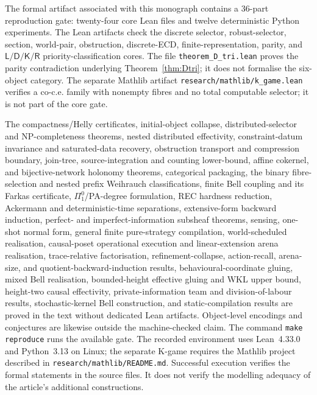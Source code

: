 \documentclass[11pt]{article}
\theoremstyle{plain}
\theoremstyle{definition}
\theoremstyle{remark}
\begin{document}
The formal artifact associated with this monograph contains a 36-part reproduction
gate: twenty-four core Lean files and twelve deterministic Python experiments.
The Lean artifacts check the discrete selector, robust-selector, section,
world-pair, obstruction, discrete-ECD, finite-representation, parity, and
$\mathsf L/\mathsf D/\mathsf K/\mathsf R$ priority-classification cores.
The file \texttt{theorem\_D\_tri.lean} proves the parity contradiction underlying
Theorem~\ref{thm:Dtri}; it does not formalise the six-object category. The
separate Mathlib artifact \texttt{research/mathlib/k\_game.lean} verifies a
co-c.e. family with nonempty fibres and no total computable selector; it is not
part of the core gate.

The compactness/Helly certificates, initial-object collapse, distributed-selector
and NP-completeness theorems, nested distributed effectivity,
constraint-datum invariance and saturated-data recovery, obstruction transport
and compression boundary, join-tree, source-integration and counting lower-bound, affine cokernel, and
bijective-network holonomy theorems, categorical packaging, the binary
fibre-selection and nested prefix Weihrauch classifications, finite Bell
coupling and its Farkas certificate, $\Pi^0_1$/PA-degree formulation, REC
hardness reduction, Ackermann and deterministic-time separations,
extensive-form backward induction, perfect- and imperfect-information subsheaf
theorems, sensing, one-shot normal form, general finite pure-strategy
compilation, world-scheduled realisation, causal-poset operational execution and
linear-extension arena realisation, trace-relative factorisation, refinement-collapse, action-recall, arena-size,
and quotient-backward-induction results,
behavioural-coordinate gluing, mixed Bell realisation, bounded-height effective
gluing and WKL upper bound, height-two causal effectivity,
private-information team and division-of-labour
results, stochastic-kernel Bell construction, and static-compilation results are
proved in the text without dedicated Lean artifacts. Object-level
encodings and conjectures are likewise outside the machine-checked claim. The
command \texttt{make reproduce} runs the available gate. The recorded environment
uses Lean~4.33.0 and Python~3.13 on Linux; the separate K-game requires the
Mathlib project described in \texttt{research/mathlib/README.md}. Successful execution verifies the formal statements in the source files. It
does not verify the modelling adequacy of the article's additional
constructions.
\end{document}

